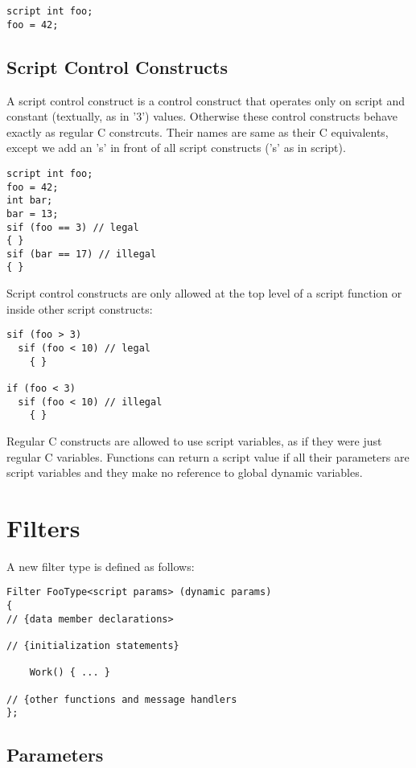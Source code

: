 \documentclass[draft]{article}
\begin{document}
\begin{verbatim}
script int foo;
foo = 42;
\end{verbatim}

\subsection{Script Control Constructs}

A script control construct is a control construct that operates only
on script and constant (textually, as in '3') values.  Otherwise these
control constructs behave exactly as regular C constrcuts.  Their
names are same as their C equivalents, except we add an 's' in front
of all script constructs ('s' as in script).

\begin{verbatim}
script int foo;
foo = 42;
int bar;
bar = 13;
sif (foo == 3) // legal
{ }
sif (bar == 17) // illegal
{ }
\end{verbatim}

Script control constructs are only allowed at the top level of a
script function or inside other script constructs:

\begin{verbatim}
sif (foo > 3)
  sif (foo < 10) // legal
    { }

if (foo < 3)
  sif (foo < 10) // illegal
    { }
\end{verbatim}

Regular C constructs are allowed to use script variables, as if they
were just regular C variables.  Functions can return a script value if
all their parameters are script variables and they make no reference
to global dynamic variables.

\section{Filters}
A new filter type is defined as follows:

\begin{verbatim}
Filter FooType<script params> (dynamic params)
{
// {data member declarations>

// {initialization statements}

	Work() { ... }

// {other functions and message handlers
};
\end{verbatim}

\subsection{Parameters}
\end{document}
